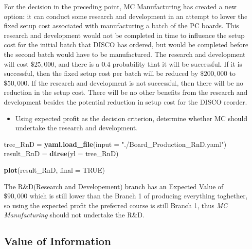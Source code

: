 \documentclass[]{article}
\newenvironment{Shaded}{\begin{snugshade}}{\end{snugshade}}
\newcommand{\KeywordTok}[1]{\textcolor[rgb]{0.13,0.29,0.53}{\textbf{#1}}}
\newcommand{\DataTypeTok}[1]{\textcolor[rgb]{0.13,0.29,0.53}{#1}}
\newcommand{\StringTok}[1]{\textcolor[rgb]{0.31,0.60,0.02}{#1}}
\newcommand{\OtherTok}[1]{\textcolor[rgb]{0.56,0.35,0.01}{#1}}
\newcommand{\NormalTok}[1]{#1}
\providecommand{\tightlist}{%
  \setlength{\itemsep}{0pt}\setlength{\parskip}{0pt}}
\begin{document}
For the decision in the preceding point, MC Manufacturing has created a
new option: it can conduct some research and development in an attempt
to lower the fixed setup cost associated with manufacturing a batch of
the PC boards. This research and development would not be completed in
time to influence the setup cost for the initial batch that DISCO has
ordered, but would be completed before the second batch would have to be
manufactured. The research and development will cost \(\$25,000\), and
there is a 0.4 probability that it will be successful. If it is
successful, then the fixed setup cost per batch will be reduced by
\(\$200,000\) to \(\$50,000\). If the research and development is not
successful, then there will be no reduction in the setup cost. There
will be no other benefits from the research and development besides the
potential reduction in setup cost for the DISCO reorder.

\begin{itemize}
\tightlist
\item
  Using expected profit as the decision criterion, determine whether MC
  should undertake the research and development.
\end{itemize}

\begin{Shaded}
\begin{Highlighting}[]
\NormalTok{tree_RnD =}\StringTok{ }\KeywordTok{yaml.load_file}\NormalTok{(}\DataTypeTok{input =} \StringTok{"./Board_Production_RnD.yaml"}\NormalTok{)}
\NormalTok{result_RnD =}\StringTok{ }\KeywordTok{dtree}\NormalTok{(}\DataTypeTok{yl =}\NormalTok{ tree_RnD)}

\KeywordTok{plot}\NormalTok{(result_RnD, }\DataTypeTok{final =} \OtherTok{TRUE}\NormalTok{)}
\end{Highlighting}
\end{Shaded}

\hypertarget{htmlwidget-f3042a54266a04061cd0}{}

The R\&D(Research and Developement) branch has an Expected Value of
\(\$90,000\) which is still lower than the Branch 1 of producing
everything toghether, so using the expected profit the preferred course
is still Branch 1, thus \emph{MC Manufacturing} should not undertake the
R\&D.

\subsection{Value of Information}\label{value-of-information}
\end{document}
